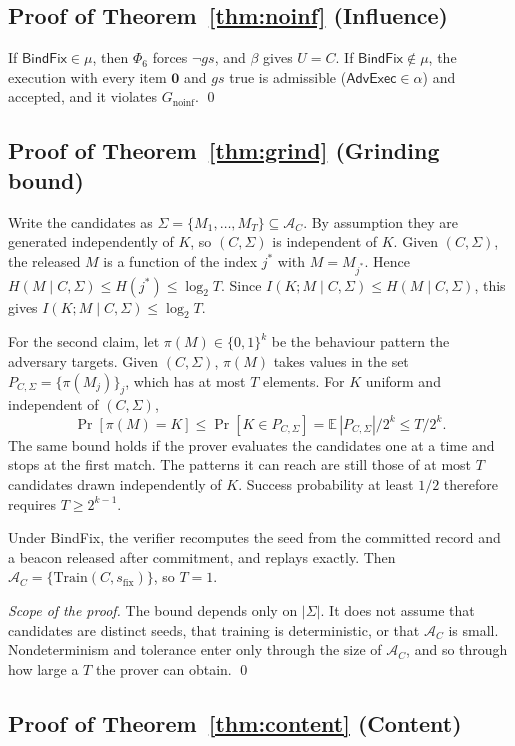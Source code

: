 \subsection*{Proof of Theorem~\ref{thm:noinf} (Influence)}

If $\textsf{BindFix}\in\mu$, then $\Phi_6$ forces $\neg\mathit{gs}$, and $\beta$ gives
$U=C$. If $\textsf{BindFix}\notin\mu$, the execution with every item $\mathbf 0$ and
$\mathit{gs}$ true is admissible ($\textsf{AdvExec}\in\alpha$) and accepted, and it
violates $G_{\mathrm{noinf}}$. \qed

\subsection*{Proof of Theorem~\ref{thm:grind} (Grinding bound)}

Write the candidates as $\Sigma=\{M_1,\dots,M_T\}\subseteq\mathcal A_C$. By assumption
they are generated independently of $K$, so $(C,\Sigma)$ is independent of $K$. Given
$(C,\Sigma)$, the released $M$ is a function of the index $j^\ast$ with $M=M_{j^\ast}$.
Hence $H(M\mid C,\Sigma)\le H(j^\ast)\le\log_2T$. Since $I(K;M\mid C,\Sigma)\le
H(M\mid C,\Sigma)$, this gives $I(K;M\mid C,\Sigma)\le\log_2T$.

For the second claim, let $\pi(M)\in\{0,1\}^k$ be the behaviour pattern the adversary
targets. Given $(C,\Sigma)$, $\pi(M)$ takes values in the set
$P_{C,\Sigma}=\{\pi(M_j)\}_j$, which has at most $T$ elements. For $K$ uniform and
independent of $(C,\Sigma)$,
\[
\Pr[\pi(M)=K]\le\Pr[K\in P_{C,\Sigma}]=\mathbb E\,|P_{C,\Sigma}|/2^k\le T/2^k.
\]
The same bound holds if the prover evaluates the candidates one at a time and stops at the
first match. The patterns it can reach are still those of at most $T$ candidates drawn
independently of $K$. Success probability at least $1/2$ therefore requires $T\ge2^{k-1}$.

Under \textsf{BindFix}, the verifier recomputes the seed from the committed record and a
beacon released after commitment, and replays exactly. Then
$\mathcal A_C=\{\mathrm{Train}(C,s_{\mathrm{fix}})\}$, so $T=1$.

\emph{Scope of the proof.} The bound depends only on $|\Sigma|$. It does not assume that
candidates are distinct seeds, that training is deterministic, or that $\mathcal A_C$ is
small. Nondeterminism and tolerance enter only through the size of $\mathcal A_C$, and so
through how large a $T$ the prover can obtain. \qed

\subsection*{Proof of Theorem~\ref{thm:content} (Content)}

